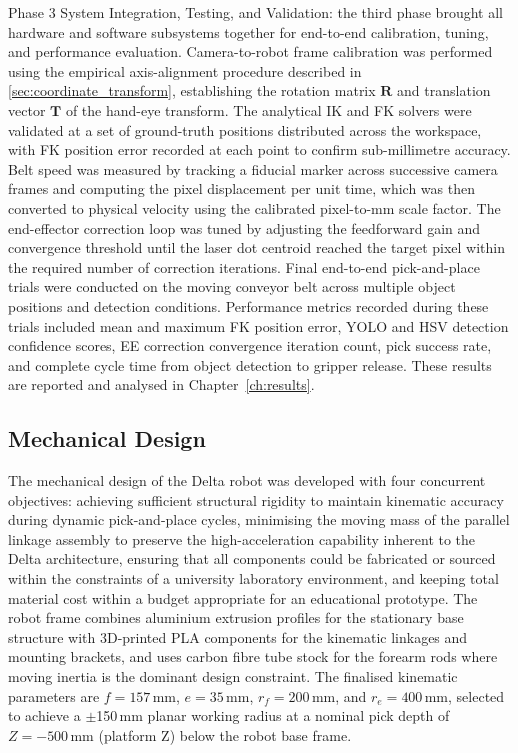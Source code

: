 \par
\hspace{1.27cm}
Phase 3 System Integration, Testing, and
Validation: the third phase brought all hardware and software subsystems
together for end-to-end calibration, tuning, and performance
evaluation. Camera-to-robot frame calibration was performed
using the empirical axis-alignment procedure described in
\autoref{sec:coordinate_transform}, establishing the rotation
matrix $\mathbf{R}$ and translation vector $\mathbf{T}$ of the
hand-eye transform. The analytical IK and FK solvers were
validated at a set of ground-truth positions distributed across
the workspace, with FK position error recorded at each point to
confirm sub-millimetre accuracy. Belt speed was measured by
tracking a fiducial marker across successive camera frames and
computing the pixel displacement per unit time, which was then
converted to physical velocity using the calibrated
pixel-to-mm scale factor. The end-effector correction loop was
tuned by adjusting the feedforward gain and convergence
threshold until the laser dot centroid reached the target pixel
within the required number of correction iterations. Final
end-to-end pick-and-place trials were conducted on the
moving conveyor belt across multiple object positions and
detection conditions. Performance metrics recorded during
these trials included mean and maximum FK position error,
YOLO and HSV detection confidence scores, EE correction
convergence iteration count, pick success rate, and
complete cycle time from object detection to gripper release.
These results are reported and analysed in
Chapter~\ref{ch:results}.

\subsection{Mechanical Design}
\hspace{1.27cm}
The mechanical design of the Delta robot was developed with four
concurrent objectives: achieving sufficient structural rigidity
to maintain kinematic accuracy during dynamic pick-and-place
cycles, minimising the moving mass of the parallel linkage
assembly to preserve the high-acceleration capability inherent
to the Delta architecture, ensuring that all components could
be fabricated or sourced within the constraints of a university
laboratory environment, and keeping total material cost within a
budget appropriate for an educational prototype. The robot frame
combines aluminium extrusion profiles for the stationary base
structure with 3D-printed PLA components for the kinematic
linkages and mounting brackets, and uses carbon fibre tube stock
for the forearm rods where moving inertia is the dominant design
constraint. The finalised kinematic parameters are $f = 157$\,mm,
$e = 35$\,mm, $r_f = 200$\,mm, and $r_e = 400$\,mm, selected to
achieve a $\pm$150\,mm planar working radius at a nominal pick
depth of $Z = -500$\,mm (platform Z) below the robot base frame.

